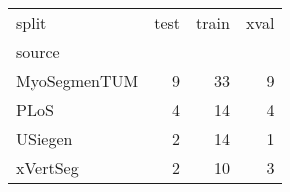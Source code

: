 \begin{tabular}{lrrr}
\toprule
split &  test &  train &  xval \\
source       &       &        &       \\
\midrule
MyoSegmenTUM &     9 &     33 &     9 \\
PLoS         &     4 &     14 &     4 \\
USiegen      &     2 &     14 &     1 \\
xVertSeg     &     2 &     10 &     3 \\
\bottomrule
\end{tabular}
